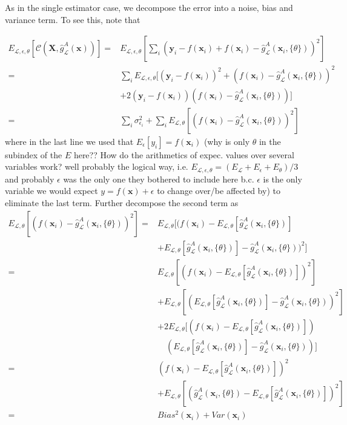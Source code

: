 \documentclass[norsk,a4paper,11pt]{article}
\begin{document}
As in the single estimator case, we decompose the error into a noise, bias and variance term. To see this, note that

\begin{align}
	E_{\mathcal{L}, \epsilon, \theta} [\mathcal{C} (\bm{X}, \hat{g}_\mathcal{L}^A (\bm{x}))] 
	=& E_{\mathcal{L}, \epsilon, \theta} [\sum_i (\bm{y}_i -f(\bm{x}_i) + f(\bm{x}_i)- \hat{g}_\mathcal{L}^A (\bm{x}_i, \{ \theta\}))^2] \\
	=& \sum_i E_{\mathcal{L}, \epsilon, \theta} [ (\bm{y}_i -f(\bm{x}_i))^2 + (f(\bm{x}_i)- \hat{g}_\mathcal{L}^A (\bm{x}_i, \{ \theta\}))^2 \nonumber \\
	&+ 2(\bm{y}_i -f(\bm{x}_i))(f(\bm{x}_i)- \hat{g}_\mathcal{L}^A (\bm{x}_i, \{ \theta\})) ] \\
	=& \sum_i \sigma_{\epsilon_i}^2 + \sum_i E_{\mathcal{L}, \theta} [(f(\bm{x}_i)- \hat{g}_\mathcal{L}^A (\bm{x}_i, \{ \theta\}))^2]
\end{align}
where in the last line we used that $E_\epsilon [y_i] = f(\bm{x}_i)$ (why is only $\theta$ in the subindex of the $E$ here?? How do the arithmetics of expec. values over several variables work? well probably the logical way, i.e. $E_{\mathcal{L}, \epsilon, \theta} = (E_\mathcal{L} + E_\epsilon + E_\theta)/3$ and probably $\epsilon$ was the only one they bothered to include here b.c. $\epsilon$ is the only variable we would expect $y= f(\bm{x}) + \epsilon$ to change over/be affected by) to eliminate the last term. Further decompose the second term as
\begin{align}
	E_{\mathcal{L}, \theta} [(f(\bm{x}_i)- \hat{g}_\mathcal{L}^A (\bm{x}_i, \{ \theta\}))^2] 
	=& E_{\mathcal{L}, \theta} [(f(\bm{x}_i)- E_{\mathcal{L}, \theta} [\hat{g}_\mathcal{L}^A (\bm{x}_i, \{ \theta\})] \nonumber \\
	&+ E_{\mathcal{L}, \theta} [\hat{g}_\mathcal{L}^A (\bm{x}_i, \{ \theta\})] -   \hat{g}_\mathcal{L}^A (\bm{x}_i, \{ \theta\}))^2] \\
	=& E_{\mathcal{L}, \theta} [(f(\bm{x}_i)- E_{\mathcal{L}, \theta} [\hat{g}_\mathcal{L}^A (\bm{x}_i, \{ \theta\})] )^2] \nonumber \\
	&+ E_{\mathcal{L}, \theta} [(E_{\mathcal{L}, \theta} [\hat{g}_\mathcal{L}^A (\bm{x}_i, \{ \theta\})] -   \hat{g}_\mathcal{L}^A (\bm{x}_i, \{ \theta\}))^2] \nonumber \\
	&+ 2E_{\mathcal{L}, \theta} [(f(\bm{x}_i)- E_{\mathcal{L}, \theta} [\hat{g}_\mathcal{L}^A (\bm{x}_i, \{ \theta\})] ) \nonumber \\
	&\quad (E_{\mathcal{L}, \theta} [\hat{g}_\mathcal{L}^A (\bm{x}_i, \{ \theta\})] -   \hat{g}_\mathcal{L}^A (\bm{x}_i, \{ \theta\}))] \\
	=& (f(\bm{x}_i)- E_{\mathcal{L}, \theta} [\hat{g}_\mathcal{L}^A (\bm{x}_i, \{ \theta\})] )^2 \nonumber \\
	&+E_{\mathcal{L}, \theta} [(\hat{g}_\mathcal{L}^A (\bm{x}_i, \{ \theta\}) - E_{\mathcal{L}, \theta} [\hat{g}_\mathcal{L}^A (\bm{x}_i, \{ \theta\})  ] )^2] \\
	=& Bias^2(\bm{x}_i) + Var(\bm{x}_i)
\end{align}
\end{document}
